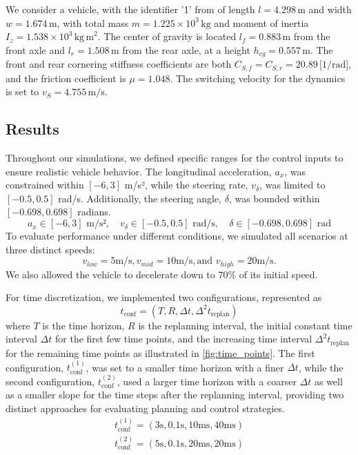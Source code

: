 We consider a vehicle, with the identifier '1' from \cite{noauthor_dateien_2021} of length \(l = 4.298\,\mathrm{m}\) and width \(w =
1.674\,\mathrm{m}\), with total mass \(m = 1.225\times10^3\,\mathrm{kg}\) and moment of inertia \(I_z = 1.538\times10^3\,\mathrm{kg\,m}^2\).
The center of gravity is located \(l_f = 0.883\,\mathrm{m}\) from the front axle and \(l_r = 1.508\,\mathrm{m}\) from the rear axle, at a height
\(h_{cg} = 0.557\,\mathrm{m}\).
The front and rear cornering stiffness coefficients are both \(C_{S,f} = C_{S,r} = 20.89\,\text{[1/rad]}\), and the friction coefficient is \(\mu =
1.048\).
The switching velocity for the dynamics is set to \(v_S = 4.755\,\mathrm{m/s}\).

\subsection{Results}
\label{subsec:results}

Throughout our simulations, we defined specific ranges for the control inputs to ensure realistic vehicle behavior.
The longitudinal acceleration, $a_x$, was constrained within $[-6, 3]$ m/s², while the steering rate, $v_\delta$, was limited to $[-0.5, 0.5]$ rad/s.
Additionally, the steering angle, $\delta$, was bounded within $[-0.698, 0.698]$ radians.
\[
	a_x \in [-6, 3] \text{ m/s²}, \quad v_\delta \in [-0.5, 0.5] \text{ rad/s}, \quad \delta \in [-0.698, 0.698] \text{ rad}
\]
To evaluate performance under different conditions, we simulated all scenarios at three distinct speeds:
\[
	v_{low}=5 \text{m/s}, v_{mid}=10 \text{m/s}, \text{and } v_{high}=20 \text{m/s}.
\]
We also allowed the vehicle to decelerate down to $70\%$ of its initial speed.

For time discretization, we implemented two configurations, represented as \[ t_{\text{conf}} = (T, R, \Delta t, \Delta^2 t_{\text{replan}}) \] where
$T$ is the time horizon, $R$ is the replanning interval, the initial constant time interval $\Delta t$ for the first few time points, and the
increasing time interval $\Delta^2 t_{\text{replan}}$ for the remaining time points as illustrated in \ref{fig:time_points}.
The first configuration, $t_{\text{conf}}^{(1)}$, was set to a smaller time horizon with a finer $\Delta t$, while the second configuration,
$t_{\text{conf}}^{(2)}$, used a larger time horizon with a coarser $\Delta t$ as well as a smaller slope for the time steps after the replanning
interval, providing two distinct approaches for evaluating planning and control strategies.
\begin{align*}
	t_{\text{conf}}^{(1)} = (3\text{s}, 0.1\text{s}, 10\text{ms}, 40\text{ms}) \\
	t_{\text{conf}}^{(2)} = (5\text{s}, 0.1\text{s}, 20\text{ms}, 20\text{ms})
\end{align*}


